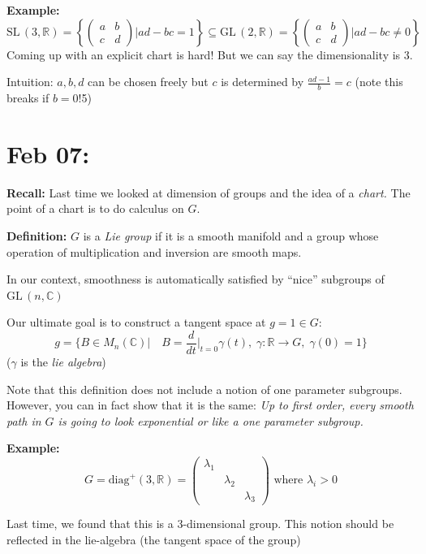 \documentclass[12pt]{article}
\newcommand{\R}{\mathbb{R}}
\newcommand{\C}{\mathbb{C}}
\newcommand{\SL}{\text{SL}\,}
\newcommand{\GL}{\text{GL}\,}
\begin{document}
    \textbf{Example:} 
    \[\SL(3, \R) = \left\{\begin{pmatrix}
        a & b\\ 
        c & d
    \end{pmatrix} \bigg\vert ad - bc = 1\right\} \subseteq \GL(2, \R) = \left\{\begin{pmatrix}
        a & b\\ 
        c & d
    \end{pmatrix} \bigg\vert ad - bc \neq 0\right\}\]
    Coming up with an explicit chart is hard! But we can say the dimensionality is $3$. 

    Intuition: $a, b, d$ can be chosen freely but $c$ is determined by $\frac{ad - 1}{b} = c$ (note this breaks if $b = 0$!5)

\section{Feb 07:}
    \textbf{Recall:} Last time we looked at dimension of groups and the idea of a \emph{chart.} The point of a chart is to do calculus on $G$. 

    \textbf{Definition:} $G$ is a \emph{Lie group} if it is a smooth manifold and a group whose operation of multiplication and inversion are smooth maps.

    In our context, smoothness is automatically satisfied by ``nice'' subgroups of $\GL(n, \C)$

    Our ultimate goal is to construct a tangent space at $g = 1 \in G$: 
    \[g = \{B \in M_n(\C) \bigg\vert \quad B = \frac{d}{dt}\bigg\vert_{t = 0} \gamma(t), \; \gamma: \R\to G,\; \gamma(0) = 1\}\]
    ($\gamma$ is the \emph{lie algebra})

    Note that this definition does not include a notion of one parameter subgroups. However, you can in fact show that it is the same: \emph{Up to first order, every smooth path in $G$ is going to look exponential or like a one parameter subgroup.}

    \textbf{Example:} 
    \[G = \text{diag}^+(3, \R) = \begin{pmatrix}
        \lambda_1\\ 
        & \lambda_2\\
        & & \lambda_3
    \end{pmatrix} \text{ where } \lambda_i > 0\]

    Last time, we found that this is a 3-dimensional group. This notion should be reflected in the lie-algebra (the tangent space of the group) 
\end{document}
